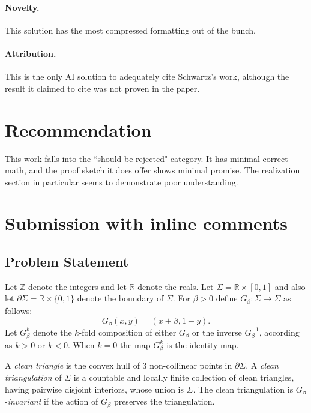 \documentclass[12pt]{article}
\begin{document}
\paragraph{Novelty.}

This solution has the most compressed formatting out of the bunch. 

\paragraph{Attribution.}

This is the only AI solution to adequately cite Schwartz's work, although the result it claimed to cite was not proven in the paper. 

\section{Recommendation}

  This work falls into the ``should be rejected" category. It has minimal correct math, and the proof sketch it does offer shows minimal promise. The realization section in particular seems to demonstrate poor understanding.

  \section{Submission with inline comments}


\date{}


\subsection*{Problem Statement}

Let $\mathbb{Z}$ denote the integers and let $\mathbb{R}$ denote the reals.
Let $\Sigma= \mathbb{R} \times [0,1]$ and also let $\partial \Sigma=\mathbb{R} \times \{0,1\}$ denote the boundary of $\Sigma$. 
For $\beta>0$ define $G_{\beta}: \Sigma \to \Sigma$ as follows:
\[
G_{\beta}(x,y)=(x+\beta,1-y).
\]
Let $G_{\beta}^k$ denote the $k$-fold composition of either $G_{\beta}$ or the inverse $G_{\beta}^{-1}$, according as $k>0$ or $k<0$. When $k=0$ the map $G_{\beta}^k$ is the identity map.

A \textit{clean triangle} is the convex hull of $3$ non-collinear points in $\partial \Sigma$. 
A \textit{clean triangulation} of $\Sigma$ is a countable and locally finite collection of clean triangles, having pairwise disjoint interiors, whose union is $\Sigma$. The clean triangulation is $G_{\beta}$-\textit{invariant} if the action of $G_{\beta}$ preserves the triangulation.
\end{document}
